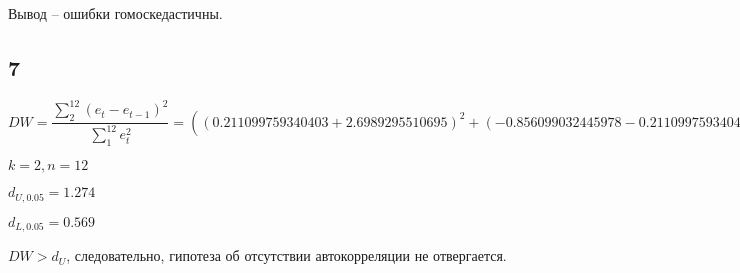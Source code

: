 \documentclass[12pt,a4paper, oneside]{extreport}
\begin{document}
Вывод -- ошибки гомоскедастичны.

\newpage

\subsection*{7}


$DW = \dfrac{\sum_2^{12} (e_t - e_{t-1})^2}{\sum_1^{12} e_t^2} = (( 0.211099759340403 + 2.6989295510695 )^2+ ( -0.856099032445978 - 0.211099759340403 )^2+ ( -2.13926168682379 + 0.856099032445978 )^2+ ( -1.28812303475612 + 2.13926168682379 )^2+ ( 1.54404462387122 +1.28812303475612 )^2+ ( 1.72084869150117 - 1.54404462387122 )^2+ ( 3.41469538422851 - 1.72084869150117 )^2+ ( -2.17567546273412 - 3.41469538422851 )^2+ ( 1.43423483690452 +2.17567546273412 )^2+ ( -0.0985320925375037 - 1.43423483690452 )^2+ ( 0.931697564521175 +0.0985320925375037 )^2)/(( -2.6989295510695 )^2+ ( 0.211099759340403 )^2+ ( -0.856099032445978 )^2+ ( -2.13926168682379 )^2+ ( -1.28812303475612 )^2+ ( 1.54404462387122 )^2+ ( 1.72084869150117 )^2+ ( 3.41469538422851 )^2+ ( -2.17567546273412 )^2+ ( 1.43423483690452 )^2+ ( -0.0985320925375037 )^2+ ( 0.931697564521175 )^2)= \dfrac{70.5941233789183}{38.9712916989129} = 1.81143914664977$

$k = 2, n=12$

$ d_{U,0.05} = 1.274 $

$ d_{L,0.05} = 0.569 $

$DW > d_U$, следовательно, гипотеза об отсутствии автокорреляции не отвергается.
\end{document}
